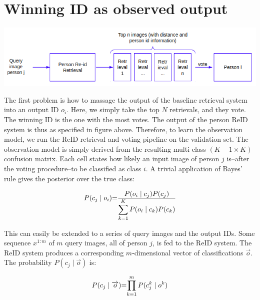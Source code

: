\documentclass[10pt,a4paper,final]{article}
\begin{document}
\section{Winning ID as observed output}

\includegraphics[width=\textwidth]{figures/first_idea.png}

The first problem is how to massage the output of the baseline retrieval system into an output ID $o_i$. Here, we simply take the top $N$ retrievals, and they vote. The winning ID is the one with the most votes. The output of the person ReID system is thus as specified in figure above. Therefore, to learn the observation model, we run the ReID retrieval and voting pipeline on the validation set. The observation model is simply derived from the resulting multi-class $(K-1 \times K)$ confusion matrix. Each cell states how likely an input image of person $j$ is--after the voting procedure--to be classified as class $i$. A trivial application of Bayes' rule gives the posterior over the true class:

\begin{equation}
	\label{eq:first_idea}
	\begin{tabular}{r@{=}l}
		$P(c_j \mid o_i)$ & $\frac{\displaystyle P(o_i \mid c_j) P(c_j)}{\displaystyle\sum_{k=1}^{K} P(o_i \mid c_k) P(c_k)}$ \\ 
	\end{tabular}
\end{equation}

This can easily be extended to a series of query images and the output IDs. Some sequence $x^{1:m}$ of $m$ query images, all of person $j$, is fed to the ReID system. The ReID system produces a corresponding $m$-dimensional vector of classifications $\overrightarrow{o}$. The probability $P(c_j \mid \overrightarrow{o})$ is:

\begin{equation}
	\label{eq:joint_first_idea}
	\begin{tabular}{r@{=}l}
	$P(c_j \mid \overrightarrow{o})$ & $\displaystyle \prod_{k=1}^{m} P(c^k_{j} \mid o^k)$ \\ 
	\end{tabular}
\end{equation}
\end{document}

